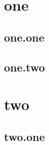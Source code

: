\documentclass{beamer}
\begin{document}
        \section{one}
            \subsection{one.one}
                \begin{frame}
                \frametitle{}
                \end{frame}
            \subsection{one.two}
                \begin{frame}
                \frametitle{}
                \end{frame}
        \section{two}
            \subsection{two.one}
                \begin{frame}
                \frametitle{}
                \end{frame}
        
\end{document}
